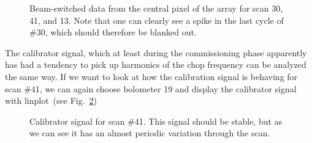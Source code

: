 \documentclass[twoside,11pt]{article}
\newcommand{\task}[1]{\textsf{#1}}
\newcommand{\linplot}{\xref{\task{linplot}}{sun95}{LINPLOT}}
\newcommand{\rotate}{\xref{\task{rotate}}{sun95}{ROTATE}}
\newcommand{\xref}[3]{#1}
\begin{document}
{%
%
%
%
%

\begin{figure}
\begin{center}
\caption{Beam-switched data from the central pixel of
the array for scan 30, 41, and 13. Note that one can clearly see a
spike in the last cycle of \#30, which should therefore be blanked out.}
\label{fig:bsw}
\end{center}
\end{figure}

The calibrator signal, which at least during the commissioning phase
apparently has had a tendency to pick up harmonics of the chop frequency
can be analyzed the same way. If we want to look at how the calibration
signal is behaving for scan \#41, we can again choose bolometer 19 and
display the calibrator signal with \linplot\ (see Fig.\ \ref{fig:calb})


\begin{figure}
\begin{center}
\caption{Calibrator signal for scan \#41. This signal should be stable,
but as we can see it has an almost periodic variation through the scan.}
\label{fig:calb}
\end{center}
\end{figure}


}
\end{document}
